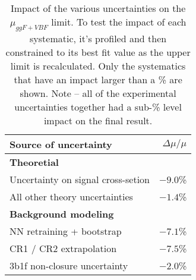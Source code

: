 \begin{table}[h]
	\centering
	\begin{tabular}{l r}
	\toprule
		   Source of uncertainty \qquad & $ \Delta \mu / \mu$ \\
             \hline
             \textbf{Theoretial}                                        &   \\
                         Uncertainty on signal cross-setion               & $-9.0$\%  \\
                         All other theory uncertainties                        & $-1.4$\%  \\
              \hline
              \textbf{Background modeling }                                &   \\
                         NN retraining + bootstrap                             &  $-7.1$\%  \\
                         CR1 / CR2 extrapolation                              &  $-7.5$\%  \\
                         3b1f non-closure uncertainty                       &  $-2.0$\%  \\
              \bottomrule

	\end{tabular}	
\caption{Impact of the various uncertainties on the $\mu_{ggF+VBF}$ limit.
To test the impact of each systematic, it's profiled and then constrained to its best fit value as the upper limit is recalculated.
Only the systematics that have an impact larger than a \% are shown. 
Note -- all of the experimental uncertainties together had a sub-\% level impact on the final result.}
\label{tab:systematics}
\end{table}